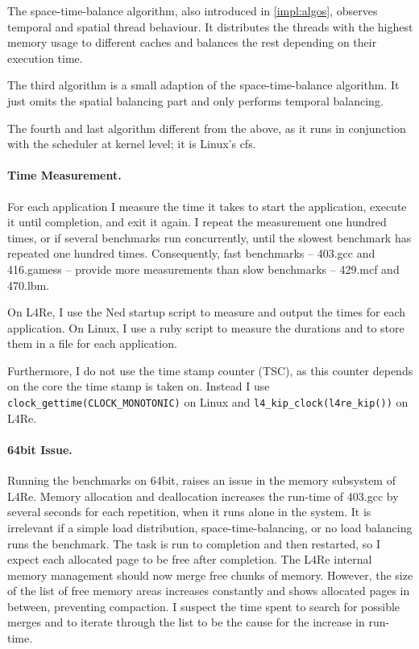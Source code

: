 The space-time-balance algorithm, also introduced in \ref{impl:algos},
observes temporal and spatial thread behaviour.
It distributes the threads with the highest memory usage to different caches
and balances the rest depending on their execution time.

The third algorithm is a small adaption of the space-time-balance algorithm.
It just omits the spatial balancing part and only performs temporal balancing.

The fourth and last algorithm different from the above, as it runs in
conjunction with the scheduler at kernel level; it is Linux's \gls{cfs}.


\paragraph{Time Measurement.}
For each application I measure the time it takes to start the application,
execute it until completion, and exit it again.
I repeat the measurement one hundred times, or if several benchmarks run
concurrently, until the slowest benchmark has repeated one hundred times.
Consequently, fast benchmarks -- 403.gcc and  416.gamess -- provide more
measurements than slow benchmarks -- 429.mcf and 470.lbm.

On L4Re, I use the Ned startup script to measure and output the times for
each application.
On Linux, I use a ruby script to measure the durations and to store them in a
file for each application.

Furthermore, I do not use the time stamp counter (TSC), as this counter depends
on the core the time stamp is taken on.
Instead I use \texttt{clock\_gettime(CLOCK\_MONOTONIC)} on Linux and
\texttt{l4\_kip\_clock(l4re\_kip())} on L4Re.


\paragraph{64bit Issue.}
Running the benchmarks on 64bit, raises an issue in the memory subsystem of L4Re.
Memory allocation and deallocation increases the run-time of 403.gcc by several
seconds for each repetition, when it runs alone in the system.
It is irrelevant if a simple load distribution, space-time-balancing,
or no load balancing runs the benchmark.
The task is run to completion and then restarted, so I expect each allocated
page to be free after completion.
The L4Re internal memory management should now merge free chunks of memory.
However, the size of the list of free memory areas increases constantly and
shows allocated pages in between, preventing compaction.
I suspect the time spent to search for possible merges and to iterate through
the list to be the cause for the increase in run-time.

